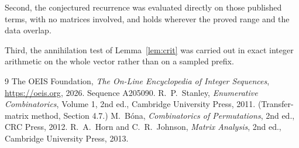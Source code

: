 \documentclass[11pt,a4paper]{article}
\theoremstyle{plain}
\theoremstyle{definition}
\begin{document}
Second, the conjectured recurrence was evaluated directly on those published terms, with no
matrices involved, and holds wherever the proved range and the data overlap.

Third, the annihilation test of Lemma~\ref{lem:crit} was carried out in exact integer
arithmetic on the whole vector rather than on a sampled prefix.

\begin{thebibliography}{9}
 The OEIS Foundation, \emph{The On-Line Encyclopedia of Integer
Sequences}, \url{https://oeis.org}, 2026. Sequence A205090.
 R.~P.~Stanley, \emph{Enumerative Combinatorics}, Volume 1, 2nd ed.,
Cambridge University Press, 2011. (Transfer-matrix method, Section 4.7.)
 M.~B\'ona, \emph{Combinatorics of Permutations}, 2nd ed., CRC
Press, 2012.
 R.~A.~Horn and C.~R.~Johnson, \emph{Matrix Analysis}, 2nd ed., Cambridge
University Press, 2013.
\end{thebibliography}
\end{document}
